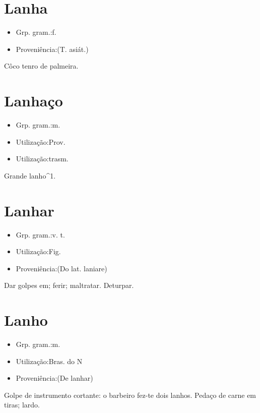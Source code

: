 \section{Lanha}
\begin{itemize}
\item {Grp. gram.:f.}
\end{itemize}
\begin{itemize}
\item {Proveniência:(T. asiát.)}
\end{itemize}
Côco tenro de palmeira.
\section{Lanhaço}
\begin{itemize}
\item {Grp. gram.:m.}
\end{itemize}
\begin{itemize}
\item {Utilização:Prov.}
\end{itemize}
\begin{itemize}
\item {Utilização:trasm.}
\end{itemize}
Grande lanho^1.
\section{Lanhar}
\begin{itemize}
\item {Grp. gram.:v. t.}
\end{itemize}
\begin{itemize}
\item {Utilização:Fig.}
\end{itemize}
\begin{itemize}
\item {Proveniência:(Do lat. \textunderscore laniare\textunderscore )}
\end{itemize}
Dar golpes em; ferir; maltratar.
Deturpar.
\section{Lanho}
\begin{itemize}
\item {Grp. gram.:m.}
\end{itemize}
\begin{itemize}
\item {Utilização:Bras. do N}
\end{itemize}
\begin{itemize}
\item {Proveniência:(De \textunderscore lanhar\textunderscore )}
\end{itemize}
Golpe de instrumento cortante: \textunderscore o barbeiro fez-te dois lanhos\textunderscore .
Pedaço de carne em tiras; lardo.
